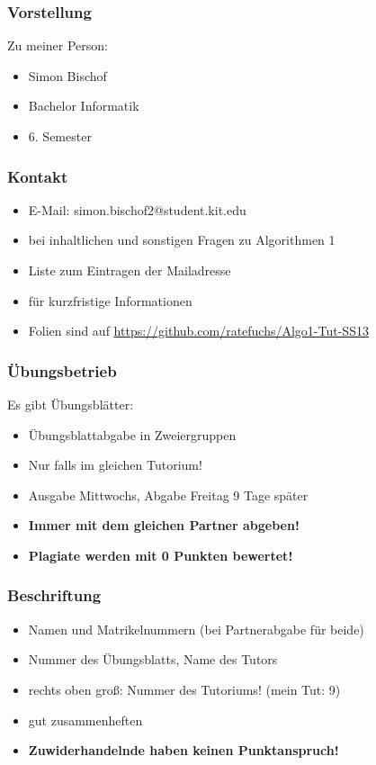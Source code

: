 

\begin{frame}
  \titlepage
\end{frame}

\begin{frame}
\frametitle{Vorstellung}
Zu meiner Person:\pause
\begin{itemize}
\item Simon Bischof
\item Bachelor Informatik
\item 6. Semester
\end{itemize}
\end{frame}

\begin{frame}
\frametitle{Kontakt}
\begin{itemize}
\item E-Mail: simon.bischof2@student.kit.edu \pause
\item bei inhaltlichen und sonstigen Fragen zu Algorithmen 1 \pause
\item Liste zum Eintragen der Mailadresse
\item für kurzfristige Informationen \pause
\item Folien sind auf \textcolor{blue}{\underline{\url{https://github.com/ratefuchs/Algo1-Tut-SS13}}}
\end{itemize}
\end{frame}

\begin{frame}
\frametitle{Übungsbetrieb}
Es gibt Übungsblätter:
\begin{itemize}
\item Übungsblattabgabe in Zweiergruppen
\item Nur falls im gleichen Tutorium! \pause
\item Ausgabe Mittwochs, Abgabe Freitag 9 Tage später \pause
\item \textbf{Immer mit dem gleichen Partner abgeben!} \pause
\item \textbf{Plagiate werden mit 0 Punkten bewertet!}
\end{itemize}
\end{frame}

\begin{frame}
\frametitle{Beschriftung}
\begin{itemize}
\item Namen und Matrikelnummern (bei Partnerabgabe für beide)
\item Nummer des Übungsblatts, Name des Tutors
\item rechts oben groß: Nummer des Tutoriums! (mein Tut: 9)
\item gut zusammenheften
\item \textbf{Zuwiderhandelnde haben keinen Punktanspruch!}
\end{itemize}
\end{frame}

